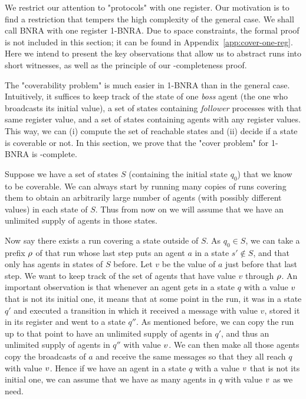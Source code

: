 	
	We restrict our attention to "protocols" with one register. Our motivation is to find a restriction that tempers the high complexity of the general case. We shall call BNRA with one register 1-BNRA. Due to space constraints, the formal proof is not included in this section; it can be found in Appendix~\ref{app:cover-one-reg}. Here we intend to present the key observations that allow us to abstract runs into short witnesses, as well as the principle of our \NP-completeness proof.
	
	The "coverability problem" is much easier in 1-BNRA than in the general case. Intuitively, it suffices to keep track of the state of one \emph{boss} agent (the one who broadcasts its initial value), a set of states containing \emph{follower} processes with that same register value, and a set of states containing agents with any register values. This way, we can (i) compute the set of reachable states and (ii) decide if a state is coverable or not. In this section, we prove that the "cover problem" for 1-BNRA is \NP-complete.

	Suppose we have a set of states $S$ (containing the initial state $q_0$) that we know to be coverable. We can always start by running many copies of runs covering them to obtain an arbitrarily large number of agents (with possibly different values) in each state of $S$. Thus from now on we will assume that we have an unlimited supply of agents in those states.

	Now say there exists a run covering a state outside of $S$. As $q_0 \in S$, we can take a prefix $\rho$ of that run whose last step puts an agent $a$ in a state $s' \notin S$, and that only has agents in states of $S$ before. 
	Let $v$ be the value of $a$ just before that last step.
	We want to keep track of the set of agents that have value $v$ through $\rho$.
	An important observation is that whenever an agent gets in a state $q$ with a value $v$ that is not its initial one, it means that at some point in the run, it was in a state $q'$ and executed a transition in which it received a message with value $v$, stored it in its register and went to a state $q''$. 
	As mentioned before, we can copy the run up to that point to have an unlimited supply of agents in $q'$, and thus an unlimited supply of agents in $q''$ with value $v$. We can then make all those agents copy the broadcasts of $a$ and receive the same messages so that they all reach $q$ with value $v$. Hence if we have an agent in a state $q$ with a value $v$ that is not its initial one, we can assume that we have as many agents in $q$ with value $v$ as we need.	
	
